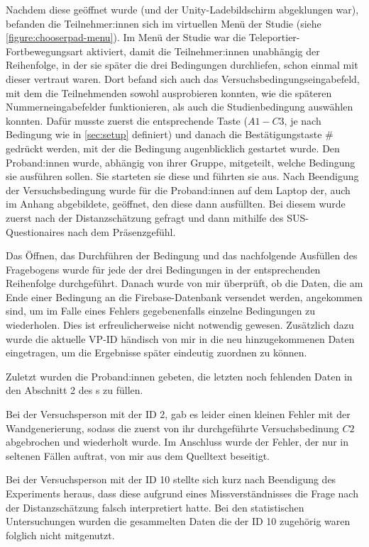         Nachdem diese geöffnet wurde (und der Unity-Ladebildschirm abgeklungen war), befanden die Teilnehmer:innen sich im virtuellen Menü der Studie (siehe \autoref{figure:chooserpad-menu}). Im Menü der Studie war die Teleportier-Fortbewegungsart aktiviert, damit die Teilnehmer:innen unabhängig der Reihenfolge, in der sie später die drei Bedingungen durchliefen, schon einmal mit dieser vertraut waren.
        Dort befand sich auch das Versuchsbedingungseingabefeld, mit dem die Teilnehmenden sowohl ausprobieren konnten, wie die späteren Nummerneingabefelder funktionieren, als auch die Studienbedingung auswählen konnten. Dafür musste zuerst die entsprechende Taste ($A1-C3$, je nach Bedingung wie in \autoref{sec:setup} definiert) und danach die Bestätigungstaste \# gedrückt werden, mit der die Bedingung augenblicklich gestartet wurde. Den Proband:innen wurde, abhängig von ihrer Gruppe, mitgeteilt, welche Bedingung sie ausführen sollen. Sie starteten sie diese und führten sie aus.
        Nach Beendigung der Versuchsbedingung wurde für die Proband:innen auf dem Laptop der, auch im Anhang abgebildete, 
        geöffnet, den diese dann ausfüllten. Bei diesem wurde zuerst nach der Distanzschätzung gefragt und dann mithilfe des SUS-Questionaires
        nach dem Präsenzgefühl.

        Das Öffnen, das Durchführen der Bedingung und das nachfolgende Ausfüllen des Fragebogens wurde für jede der drei Bedingungen in der entsprechenden Reihenfolge durchgeführt. Danach wurde von mir überprüft, ob die Daten, die am Ende einer Bedingung an die Firebase-Datenbank versendet werden, angekommen sind, um im Falle eines Fehlers gegebenenfalls einzelne Bedingungen zu wiederholen. Dies ist erfreulicherweise nicht notwendig gewesen. Zusätzlich dazu wurde die aktuelle VP-ID händisch von mir in die neu hinzugekommenen Daten eingetragen, um die Ergebnisse später eindeutig zuordnen zu können.

        Zuletzt wurden die Proband:innen gebeten, die letzten noch fehlenden Daten in den Abschnitt 2 des s zu füllen.

        Bei der Versuchsperson mit der ID 2, gab es leider einen kleinen Fehler mit der Wandgenerierung, sodass die zuerst von ihr durchgeführte Versuchsbedinung $C2$ abgebrochen und wiederholt wurde. Im Anschluss wurde der Fehler, der nur in seltenen Fällen auftrat, von mir aus dem Quelltext beseitigt.

        Bei der Versuchsperson mit der ID 10 stellte sich kurz nach Beendigung des Experiments heraus, dass diese aufgrund eines Missverständnisses die Frage nach der Distanzschätzung falsch interpretiert hatte. Bei den statistischen Untersuchungen wurden die gesammelten Daten die der ID 10 zugehörig waren folglich nicht mitgenutzt.

